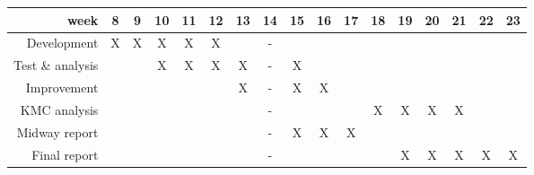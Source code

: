 \documentclass[12pt]{article}
\begin{document}
\begin{tabular}{|r|cccccccccccccccc|}
\hline
\textbf{week} & 8 & 9 & 10 & 11 & 12 & 13 & 14 & 15 & 16 & 17 & 18 & 19 & 20 & 21 & 22 & 23 \\
\hline
Development & X & X & X & X & X & & - &&&&&&&&& \\
Test \& analysis & & & X & X & X & X & - & X &&&&&&&& \\
Improvement &&&&&& X & - & X & X &&&&&&& \\
KMC analysis &&&&&&& - &&&& X & X & X & X && \\
Midway report &&&&&&& - & X & X & X &&&&&& \\
Final report &&&&&&& - &&&&& X & X & X & X & X \\
\hline
\end{tabular}

	
	

	
\newpage


\nocite{*}	

\end{document}
